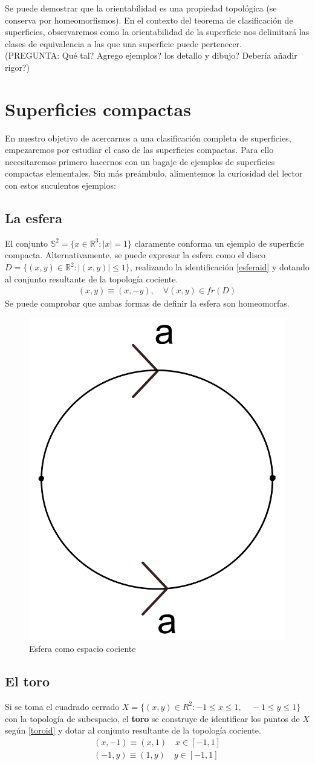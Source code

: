 \documentclass[a4paper,11pt,spanish, twoside, leqno]{tfg-uam}
\theoremstyle{definition}
\begin{document}
Se puede demostrar que la orientabilidad es una propiedad topológica (se conserva por homeomorfismos). En el contexto del teorema de clasificación de superficies, observaremos como la orientabilidad de la superficie nos delimitará las clases de equivalencia a las que una superficie puede pertenecer.
\\

(PREGUNTA: Qué tal? Agrego ejemplos? los detallo y dibujo? Debería añadir rigor?)


\section{Superficies compactas}

En nuestro objetivo de acercarnos a una clasificación  completa de superficies, empezaremos por estudiar el caso de las superficies compactas. Para ello necesitaremos primero hacernos con un bagaje de ejemplos de superficies compactas elementales. Sin más preámbulo, alimentemos la curiosidad del lector con estos suculentos ejemplos:

\subsection*{La esfera}
El conjunto $ \mathbb{S}^2 = \{x\in \mathbb{R}^3: |x|=1 \} $ claramente conforma un ejemplo de superficie compacta. Alternativamente, se puede expresar la esfera como el disco $ D = \{(x,y)\in\mathbb{R}^2: |(x,y)|\leq1 \} $, realizando la identificación  \ref{esferaid} y dotando al conjunto resultante de la topología cociente.
\begin{align}\label{esferaid}
	(x,y)\equiv(x,-y),\quad\forall(x,y)\in fr(D)
\end{align}
Se puede comprobar que ambas formas de definir la esfera son homeomorfas. 

\begin{figure}[h!]
	\centering
	\includegraphics[width=0.2\linewidth]{imagenes/esfera_plana.png}
	\caption{Esfera como espacio cociente}
	\label{fig:esfera expresion canonica}
\end{figure} 

\subsection*{El toro}
Si se toma el cuadrado cerrado $ X = \{ (x,y) \in R^2: -1\leq x\leq 1,\quad -1\leq y \leq 1  \} $ con la topología de subespacio, el \textbf{toro}  se construye de identificar los puntos de  $ X $ según  \ref{toroid} y dotar al conjunto resultante de la topología cociente.
\begin{align}\label{toroid}
	(x,-1)\equiv(x,1) \quad x\in [-1,1]  \\
	(-1,y)\equiv(1,y) \quad y\in [-1,1] \nonumber
\end{align}
\end{document}
